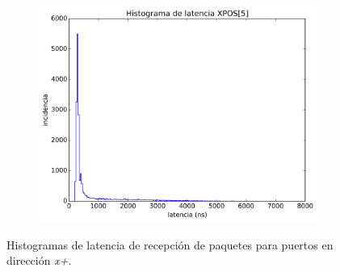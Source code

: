 \begin{figure}[ht!]
\begin{center}
\begin{subfigure}[b]{0.4\textwidth}
		    \caption{}
		    \label{fig:histograma_9}
	    \end{subfigure}
	    ~ %
	    \begin{subfigure}[b]{0.4\textwidth}
	    	\includegraphics[width=\textwidth]{figures/ch6_histograma_source_10.png}
		    \caption{}
		    \label{fig:histograma_10}
	    \end{subfigure}
    \end{center}
    \caption{%
        Histogramas de latencia de recepción de paquetes para puertos en dirección \textit{x+}.
     }%
   \label{fig:ch6_histogramas_2}
\end{figure}